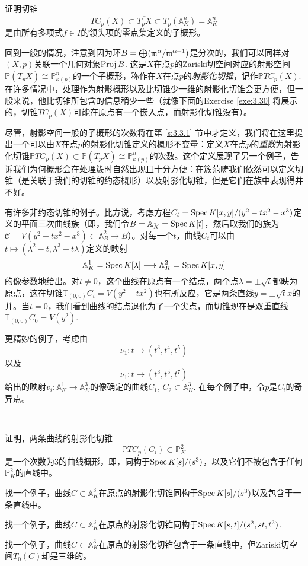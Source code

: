 \begin{exe}\label{exe:3.29}
	证明切锥
	\[
		TC_p(X)\subset \overline{T_pX}\subset \overline{T_p(\mathbb A_K^n)}=\mathbb A_K^n
	\]
	是由所有多项式$f\in I$的领头项的零点集定义的子概形。
\end{exe}

回到一般的情况，注意到因为环$B=\bigoplus (\mathfrak{m}^\alpha/\mathfrak{m}^{\alpha+1})$是分次的，我们可以同样对$(X,p)$关联一个几何对象$\operatorname{Proj} B$. 这是$X$在点$p$的Zariski切空间对应的射影空间$\mathbb P(T_p X)\cong \mathbb P^n_{\kappa(p)}$的一个子概形，称作在$X$在点$p$的\textit{射影化切锥}，记作$\mathbb PTC_p(X)$. 在许多情况中，处理作为射影概形以及比切锥少一维的射影化切锥会更方便，但一般来说，他比切锥所包含的信息稍少一些（就像下面的Exercise \ref{exe:3.30} 将展示的，切锥$TC_p(X)$可能在原点有一个嵌入点，而射影化切锥没有）。

尽管，射影空间一般的子概形的次数将在第 \ref{s:3.3.1} 节中才定义，我们将在这里提出一个可以由$X$在点$p$的射影化切锥定义的概形不变量：定义$X$在点$p$的\textit{重数}为射影化切锥$\mathbb PTC_p(X)\subset \mathbb P(T_p X)\cong \mathbb P^n_{\kappa(p)}$的次数。这个定义展现了另一个例子，告诉我们为何概形会在处理簇时自然出现且十分方便：在簇范畴我们依然可以定义切锥（是关联于我们的切锥的约态概形）以及射影化切锥，但是它们在族中表现得并不好。


有许多非约态切锥的例子。比方说，考虑方程$C_t=\operatorname{Spec} K[x,y]/(y^2-tx^2-x^3)$定义的平面三次曲线族（即，我们令$B=\mathbb A^1_K=\operatorname{Spec} K[t]$，然后取我们的族为$\mathscr C=V(y^2-tx^2-x^3)\subset \mathbb A_B^2\to B$）。对每一个$t$，曲线$C_t$可以由$t\mapsto (\lambda^2-t,\lambda^3-t\lambda)$定义的映射
\[
	\mathbb A_K^1=\operatorname{Spec} K[\lambda]\longrightarrow \mathbb A_K^2=\operatorname{Spec} K[x,y]
\]
的像参数地给出。对$t\neq 0$，这个曲线在原点有一个结点，两个点$\lambda =\pm \sqrt t$都映为原点，这在切锥$\mathbb T_{(0,0)}C_t=V(y^2-tx^2)$也有所反应，它是两条直线$y=\pm \sqrt t x$的并。当$t=0$，我们看到曲线的结点退化为了一个尖点，而切锥现在是双重直线$\mathbb T_{(0,0)}C_0=V(y^2)$.

更精妙的例子，考虑由
\[
	\nu_1:t\longmapsto (t^3,t^4,t^5)
\]
以及
\[
	\nu_1:t\longmapsto (t^3,t^5,t^7)
\]
给出的映射$v_i:\mathbb A_K^1\to \mathbb A_K^3$的像确定的曲线$C_1$, $C_2\subset \mathbb A_K^3$. 在每个例子中，令$p$是$C_i$的奇异点。

\begin{exe}~\label{exe:3.30}
	\begin{compactenum}[(a)]
		\item 证明，两条曲线的射影化切锥
		\[
			\mathbb PTC_p(C_i)\subset \mathbb P_K^2
		\]
		是一个次数为$3$的曲线概形，即，同构于$\operatorname{Spec} K[s]/(s^3)$，以及它们不被包含于任何$\mathbb P_K^2$的直线中。
		\item 找一个例子，曲线$C\subset \mathbb A_K^3$在原点的射影化切锥同构于$\operatorname{Spec} K[s]/(s^3)$以及包含于一条直线中。
		\item 找一个例子，曲线$C\subset \mathbb A_K^3$在原点的射影化切锥同构于$\operatorname{Spec} K[s,t]/(s^2,st,t^2)$.
		\item 找一个例子，曲线$C\subset \mathbb A_K^3$在原点的射影化切锥包含于一条直线中，但Zariski切空间$T_0(C)$却是三维的。
	\end{compactenum}
\end{exe}


